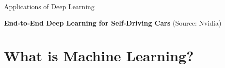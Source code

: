 \begin{frame}  {Applications of Deep Learning}
  \begin{figure}
    \centering

  \end{figure}
  \hspace{1cm} \textbf{End-to-End Deep Learning for Self-Driving Cars} (Source: Nvidia)
\end{frame}


% 
\section{What is Machine Learning? }

